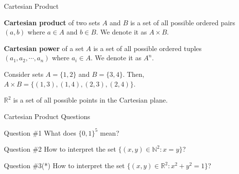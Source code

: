 \documentclass{zkdl-presentation-template}
\begin{document}
    \begin{frame}{Cartesian Product}
        \begin{definition}
          \textbf{Cartesian product} of two sets $A$ and $B$ is a set of all possible ordered pairs $(a,b)$ where $a \in A$ and $b \in B$. We denote it as $A \times B$.\pause
        \end{definition}

        \begin{definition}
          \textbf{Cartesian power} of a set $A$ is a set of all possible ordered tuples $(a_1,a_2,\cdots,a_n)$ where $a_i \in A$. We denote it as $A^n$.\pause
        \end{definition}

        \begin{example}
          Consider sets $A = \{1,2\}$ and $B = \{3,4\}$. Then, $A \times B = \{(1,3), (1,4), (2,3), (2,4)\}$.\pause
        \end{example}

        \begin{example}
          $\mathbb{R}^2$ is a set of all possible points in the Cartesian plane.
        \end{example}
    \end{frame}

    \begin{frame}{Cartesian Product Questions}
      \begin{questionblock}{Question \#1}
        What does $\{0,1\}^{5}$ mean?\pause
      \end{questionblock}

      \begin{questionblock}{Question \#2}
        How to interpret the set $\{(x,y) \in \mathbb{N}^2: x = y\}$?\pause
      \end{questionblock}

      \begin{questionblock}{Question \#3(*)}
        How to interpret the set $\{(x,y) \in \mathbb{R}^2: x^2+y^2=1\}$?
      \end{questionblock}
    \end{frame}
\end{document}
